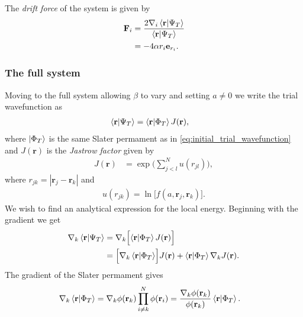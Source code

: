 \documentclass[
    a4paper, aps, twocolumn, floatfix, superscriptaddress]{revtex4-1}
\newcommand{\vf}{\mathbf}
\newcommand{\1}{\mathds{1}}
\begin{document}
            The \textit{drift force} of the system is given by
            \begin{align}
                \vf{F}_i
                &=
                \frac{2\nabla_i\bra{\vf{r}}\ket{\Psi_T}}
                {\bra{\vf{r}}\ket{\Psi_T}} \\
                &= -4\alpha r_i\vf{e}_{{r_i}}.
            \end{align}

        \subsubsection{The full system}
            Moving to the full system allowing $\beta$ to vary and setting $a
            \neq 0$ we write the trial wavefunction as
            \begin{align}
                \bra{\vf{r}}\ket{\Psi_T}
                &=
                \bra{\vf{r}}\ket{\Phi_T}
                J(\vf{r}),
            \end{align}
            where $\ket{\Phi_T}$ is the same Slater permament as in
            \autoref{eq:initial_trial_wavefunction} and $J(\vf{r})$ is the
            \textit{Jastrow factor} given by
            \begin{align}
                J(\vf{r})
                &=
                \exp\Biggl(
                    \sum_{j < l}^N u(r_{jl})
                \Biggr),
            \end{align}
            where $r_{jk} = |\vf{r}_j - \vf{r}_k|$ and
            \begin{align}
                u(r_{jk}) = \ln\bigl[f(a, \vf{r}_j, \vf{r}_k)\bigr].
            \end{align}
            We wish to find an analytical expression for the local energy.
            Beginning with the gradient we get
            \begin{align}
                \nabla_k\bra{\vf{r}}\ket{\Psi_T}
                &= \nabla_k\Bigl[
                    \bra{\vf{r}}\ket{\Phi_T}
                    J(\vf{r})
                \Bigr] \\
                &=
                \Bigl[
                    \nabla_k
                    \bra{\vf{r}}\ket{\Phi_T}
                \Bigr]
                J(\vf{r})
                + \bra{\vf{r}}\ket{\Phi_T}
                \nabla_k J(\vf{r}).
            \end{align}
            The gradient of the Slater permament gives
            \begin{align}
                \nabla_k
                \bra{\vf{r}}\ket{\Phi_T}
                &=
                \nabla_k\phi(\vf{r}_k)
                \prod_{i \neq k}^N\phi(\vf{r}_i)
                = \frac{\nabla_k\phi(\vf{r}_k)}{\phi(\vf{r}_k)}
                \bra{\vf{r}}\ket{\Phi_T}.
            \end{align}
\end{document}
